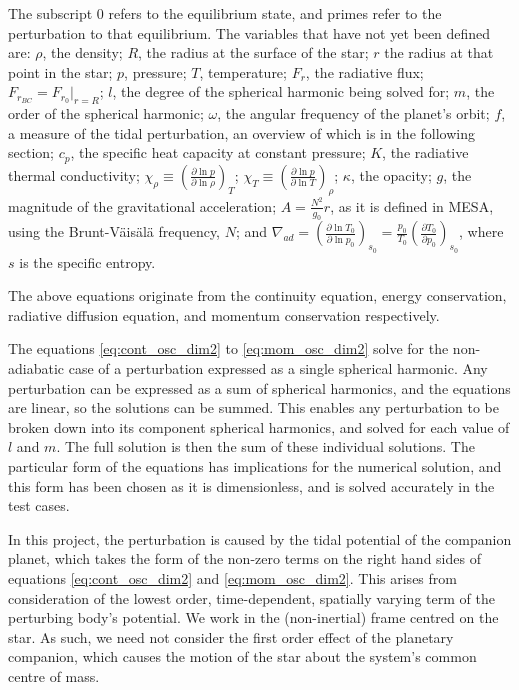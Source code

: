 \documentclass[11pt]{amsart}
\begin{document}
The subscript $0$ refers to the equilibrium state, and primes refer to the perturbation to that equilibrium.  The variables that have not yet been defined are: $\rho$, the density; $R$, the radius at the surface of the star; $r$ the radius at that point in the star; $p$, pressure; $T$, temperature; $F_{r}$, the radiative flux; $F_{r_{BC}} = F_{r_{0}} |_{r=R}$; $l$, the degree of the spherical harmonic being solved for; $m$, the order of the spherical harmonic; $\omega$, the angular frequency of the planet's orbit; $f$, a measure of the tidal perturbation, an overview of which is in the following section;  $c_{p}$, the specific heat capacity at constant pressure; $K$, the radiative thermal conductivity; $\chi_{\rho} \equiv \left( \frac{\partial \ln p}{\partial \ln \rho} \right)_{T}$; $\chi_{T} \equiv \left( \frac{\partial \ln p}{\partial \ln T} \right)_{\rho}$; $\kappa$, the opacity; $g$, the magnitude of the gravitational acceleration; $A = \frac{N^{2}}{g_{0}} r$, as it is defined in MESA, using the Brunt-V\"{a}is\"{a}l\"{a} frequency, $N$; and $\nabla_{ad} = \left( \frac{\partial \ln T_{0}}{\partial \ln p_{0}} \right)_{s_{0}} = \frac{p_{0}}{T_{0}} \left( \frac{\partial T_{0}}{\partial p_{0}} \right)_{s_{0}}$, where $s$ is the specific entropy.

The above equations originate from the continuity equation, energy conservation, radiative diffusion equation, and momentum conservation respectively. 


The equations \ref{eq:cont_osc_dim2} to \ref{eq:mom_osc_dim2} solve for the non-adiabatic case of a perturbation expressed as a single spherical harmonic.  Any perturbation can be expressed as a sum of spherical harmonics, and the equations are linear, so the solutions can be summed.  This enables any perturbation to be broken down into its component spherical harmonics, and solved for each value of $l$ and $m$.  The full solution is then the sum of these individual solutions.  The particular form of the equations has implications for the numerical solution, and this form has been chosen as it is dimensionless, and is solved accurately in the test cases.

In this project, the perturbation is caused by the tidal potential of the companion planet, which takes the form of the non-zero terms on the right hand sides of equations \ref{eq:cont_osc_dim2} and \ref{eq:mom_osc_dim2}.  This arises from consideration of the lowest order, time-dependent, spatially varying term of the perturbing body's potential.  We work in the (non-inertial) frame centred on the star.  As such, we need not consider the first order effect of the planetary companion, which causes the motion of the star about the system's common centre of mass.
\end{document}
